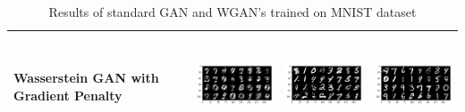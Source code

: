 \begin{table}[!htpb]
\begin{tabular}[t]{|>{\centering}p{2cm}|p{4.6cm}|p{4.6cm}|p{4.6cm}|}
		
		Wasserstein GAN with Gradient Penalty & \includegraphics[height=3cm, width=4.4cm]{Exercise4/Report/WGAN_GP_499} &  \includegraphics[height=3cm, width=4.4cm]{Exercise4/Report/WGAN_GP_9999} & \includegraphics[height=3cm, width=4.4cm]{Exercise4/Report/WGAN_GP_20000}\\ \hline	

	\end{tabular}
	
	\captionsetup{format = hang}
	\caption{Results of standard GAN and WGAN's trained on MNIST dataset}
	\label{table:4.2}
\end{table}